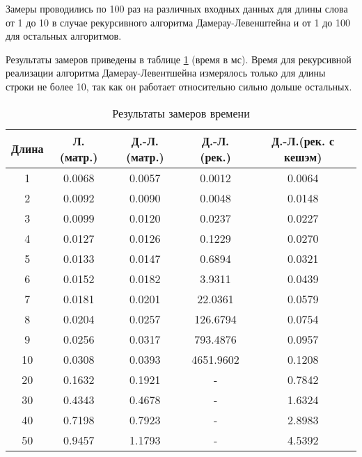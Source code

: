 Замеры проводились по 100 раз на различных входных данных для длины слова от 1 до 10 в случае рекурсивного алгоритма Дамерау-Левенштейна и от 1 до 100 для остальных алгоритмов.

Результаты замеров приведены в таблице \ref{tbl:time_mes} (время в мс). Время для рекурсивной реализации алгоритма Дамерау-Левентшейна измерялось только для длины строки не более 10, так как он работает относительно сильно дольше остальных.

\begin{table}[h]
    \begin{center}
        \begin{threeparttable}
        \captionsetup{justification=raggedright,singlelinecheck=off}
        \caption{Результаты замеров времени}
        \label{tbl:time_mes}
        \begin{tabular}{|c|c|c|c|c|}
            \hline
            Длина & Л.(матр.) & Д.-Л.(матр.)& Д.-Л.(рек.) & Д.-Л.(рек. с кешэм)  \\
            \hline
            1 & 0.0068 & 0.0057 & 0.0012 & 0.0064 \\ 
            \hline
            2 & 0.0092 & 0.0090 & 0.0048 & 0.0148 \\ 
            \hline
            3 & 0.0099 & 0.0120 & 0.0237 & 0.0227 \\ 
            \hline
            4 & 0.0127 & 0.0126 & 0.1229 & 0.0270 \\ 
            \hline
            5 & 0.0133 & 0.0147 & 0.6894 & 0.0321 \\ 
            \hline
            6 & 0.0152 & 0.0182 & 3.9311 & 0.0439 \\ 
            \hline
            7 & 0.0181 & 0.0201 & 22.0361 & 0.0579 \\ 
            \hline
            8 & 0.0204 & 0.0257 & 126.6794 & 0.0754 \\ 
            \hline
            9 & 0.0256 & 0.0317 & 793.4876 & 0.0957 \\ 
            \hline
            10 & 0.0308 & 0.0393 & 4651.9602 & 0.1208 \\ 
            \hline
            20 & 0.1632 & 0.1921 & - & 0.7842 \\ 
            \hline
            30 & 0.4343 & 0.4678 & - & 1.6324 \\ 
            \hline
            40 & 0.7198 & 0.7923 & - & 2.8983 \\ 
            \hline
            50 & 0.9457 & 1.1793 & - & 4.5392 \\ 

\end{tabular}
\end{threeparttable}
\end{center}
\end{table}

